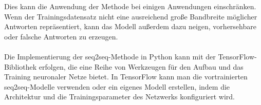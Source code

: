 Dies kann die Anwendung der Methode bei einigen Anwendungen einschränken. 
Wenn der Trainingsdatensatz nicht eine ausreichend große Bandbreite möglicher Antworten repräsentiert, kann das Modell außerdem dazu neigen, vorhersehbare oder falsche Antworten zu erzeugen.\\\\
Die Implementierung der seq2seq-Methode in Python kann mit der TensorFlow-Bibliothek erfolgen, die eine Reihe von Werkzeugen für den Aufbau und das Training neuronaler Netze bietet. 
In TensorFlow kann man die vortrainierten seq2seq-Modelle verwenden oder ein eigenes Modell erstellen, indem die Architektur und die Trainingsparameter des Netzwerks konfiguriert wird.
\endinput